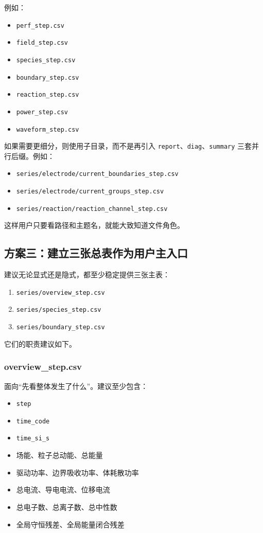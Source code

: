 \documentclass[11pt,a4paper]{ctexart}
\newcommand{\code}[1]{\texttt{#1}}
\newcommand{\file}[1]{\texttt{#1}}
\newcommand{\dir}[1]{\texttt{#1}}
\begin{document}
例如：

\begin{itemize}
  \item \file{perf\_step.csv}
  \item \file{field\_step.csv}
  \item \file{species\_step.csv}
  \item \file{boundary\_step.csv}
  \item \file{reaction\_step.csv}
  \item \file{power\_step.csv}
  \item \file{waveform\_step.csv}
\end{itemize}

如果需要更细分，则使用子目录，而不是再引入 \code{report}、\code{diag}、\code{summary} 三套并行后缀。例如：

\begin{itemize}
  \item \dir{series/electrode/current\_boundaries\_step.csv}
  \item \dir{series/electrode/current\_groups\_step.csv}
  \item \dir{series/reaction/reaction\_channel\_step.csv}
\end{itemize}

这样用户只要看路径和主题名，就能大致知道文件角色。

\subsection{方案三：建立三张总表作为用户主入口}

建议无论显式还是隐式，都至少稳定提供三张主表：

\begin{enumerate}
  \item \file{series/overview\_step.csv}
  \item \file{series/species\_step.csv}
  \item \file{series/boundary\_step.csv}
\end{enumerate}

它们的职责建议如下。

\subsubsection{overview\_step.csv}

面向“先看整体发生了什么”。建议至少包含：

\begin{itemize}
  \item \code{step}
  \item \code{time\_code}
  \item \code{time\_si\_s}
  \item 场能、粒子总动能、总能量
  \item 驱动功率、边界吸收功率、体耗散功率
  \item 总电流、导电电流、位移电流
  \item 总电子数、总离子数、总中性数
  \item 全局守恒残差、全局能量闭合残差
\end{itemize}
\end{document}
